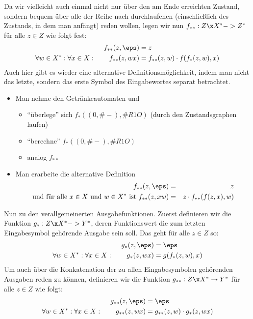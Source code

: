 Da wir vielleicht auch einmal nicht nur über den am Ende erreichten
Zustand, sondern bequem über alle der Reihe nach durchlaufenen
(einschließlich des Zustands, in dem man anfängt) reden wollen, legen
wir nun $f_{**}:Z\x X^*-> Z^*$ für alle $z\in Z$ wie folgt
fest:
% 
\begin{align*}
  f_{**}(z, \eps) &= z \\
  \forall w\in X^*:  \forall x\in X: \text{\qquad}
  f_{**}(z, wx)   &= f_{**}(z,w) \cdot f(f_*(z,w),x) 
\end{align*}
%
Auch hier gibt es wieder eine alternative Definitionsmöglichkeit,
indem man nicht das letzte, sondern das erste Symbol des Eingabewortes
separat betrachtet.
\begin{extract}[tut]
  \begin{itemize}
  \item Man nehme den Getränkeautomaten und 
    \begin{itemize}
    \item "`überlege"' sich $f_*((0,\#-), \#{R1O})$ (durch den
      Zustandsgraphen laufen)
    \item "`berechne"' $f_*((0,\#-), \#{R1O})$
    \item analog $f_{**}$
    \end{itemize}
  \item Man erarbeite die alternative Definition
    \begin{eqnarray*}
      f_{**}(z, \eps) &=& z \\
      \text{und für alle $x\in X$ und $w\in X^*$ ist\ }
      f_{**}(z, xw)   &=& z \cdot f_{**}(f(z,x),w) \\
    \end{eqnarray*}
  \end{itemize}
\end{extract}

Nun zu den verallgemeinerten Ausgabefunktionen. Zuerst definieren wir
die Funktion $g_*:Z\x X^* -> Y^*$, deren Funktionswert die zum
letzten Eingabesymbol gehörende Ausgabe sein soll. Das geht für alle
$z\in Z$ so:
\begin{align*}
  g_*(z,\eps) &= \eps \\
  \forall w\in X^*: \forall x\in X: \text{\qquad} g_*(z,wx) &= g(f_*(z,w), x)
\end{align*}
Um auch über die Konkatenation der zu allen Eingabesymbolen gehörenden
Ausgaben reden zu können, definieren wir die Funktion $g_{**}: Z\x X^*
\to Y^*$ für alle $z\in Z$ wie folgt:
\begin{align*}
  g_{**}(z,\eps) &= \eps \\
  \forall w\in X^*:  \forall x\in X: \text{\qquad} g_{**}(z,wx) &= g_{**}(z,w) \cdot g_*(z,wx)
\end{align*}


